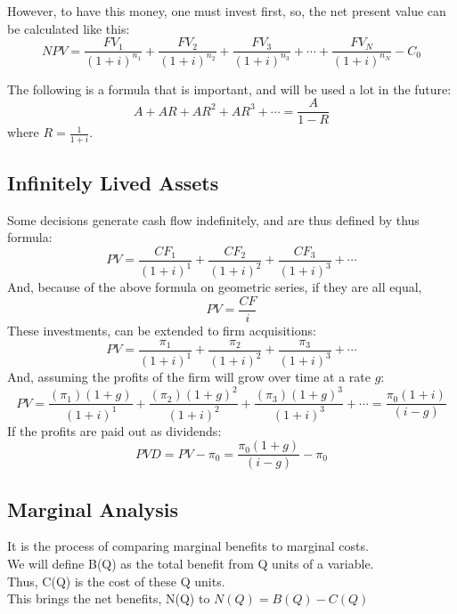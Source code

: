 \documentclass[nobib]{article}
\begin{document}
However, to have this money, one must invest first, so, the net present value
can be calculated like this:
\begin{equation*}
    NPV = \frac{FV_1}{(1+i)^{n_1}}+\frac{FV_2}{(1+i)^{n_2}}+\frac{FV_3}{(1+i)^{n_3}}+\cdots+\frac{FV_N}{(1+i)^{n_N}}-C_0
\end{equation*}

The following is a formula that is important, and will be used a lot in the
future:
\begin{equation*}
    A+AR+AR^2+AR^3+\cdots=\frac{A}{1-R}
\end{equation*}
where $R=\frac{1}{1+i}$.

\subsection{Infinitely Lived Assets}
Some decisions generate cash flow indefinitely, and are thus defined by thus
formula:
\begin{equation*}
    PV = \frac{CF_1}{(1+i)^{1}}+\frac{CF_2}{(1+i)^{2}}+\frac{CF_3}{(1+i)^{3}}+\cdots
\end{equation*}
And, because of the above formula on geometric series, if they are all equal,
\begin{equation*}
    PV=\frac{CF}{i}
\end{equation*}
These investments, can be extended to firm acquisitions:
\begin{equation*}
    PV = \frac{\pi_1}{(1+i)^{1}}+\frac{\pi_2}{(1+i)^{2}}+\frac{\pi_3}{(1+i)^{3}}+\cdots
\end{equation*}
And, assuming the profits of the firm will grow over time at a rate $g$:
\begin{equation*}
    PV = \frac{(\pi_1)(1+g)}{(1+i)^{1}}+\frac{(\pi_2)(1+g)^2}{(1+i)^{2}}+\frac{(\pi_3)(1+g)^3}{(1+i)^{3}}+\cdots = \frac{\pi_0(1+i)}{(i-g)}
\end{equation*}
If the profits are paid out as dividends:
\begin{equation*}
    PVD = PV-\pi_0=\frac{\pi_0(1+g)}{(i-g)}-\pi_0
\end{equation*}

\subsection{Marginal Analysis}
It is the process of comparing marginal benefits to marginal costs.\\ We will
define B(Q) as the total benefit from Q units of a variable.\\ Thus, C(Q) is
the cost of these Q units.\\ This brings the net benefits, N(Q) to $N(Q) =
    B(Q)-C(Q)$\\~\\
\end{document}
